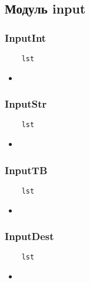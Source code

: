 \subsection{Модуль input}

\subsubsection{InputInt}

\begin{lstlisting}
    lst
\end{lstlisting}

\begin{itemize}
    \item \verb||
\end{itemize}

\subsubsection{InputStr}

\begin{lstlisting}
    lst
\end{lstlisting}

\begin{itemize}
    \item \verb||
\end{itemize}

\subsubsection{InputTB}

\begin{lstlisting}
    lst
\end{lstlisting}

\begin{itemize}
    \item \verb||
\end{itemize}

\subsubsection{InputDest}

\begin{lstlisting}
    lst
\end{lstlisting}

\begin{itemize}
    \item \verb||
\end{itemize}

